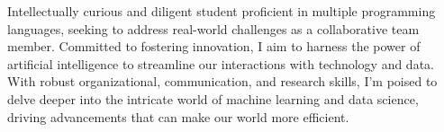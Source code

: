 \documentclass[a4paper,12pt]{article}
\begin{document}

Intellectually curious and diligent student proficient in multiple programming languages, seeking to address real-world challenges as a collaborative team member. Committed to fostering innovation, I aim to harness the power of artificial intelligence to streamline our interactions with technology and data. With robust organizational, communication, and research skills, I'm poised to delve deeper into the intricate world of machine learning and data science, driving advancements that can make our world more efficient.
\end{document}
